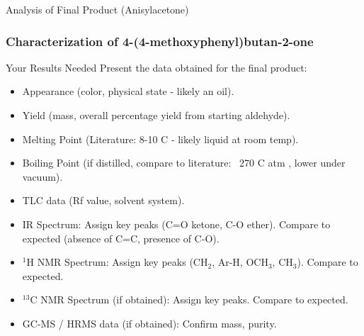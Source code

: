 \documentclass[10pt]{beamer}
\begin{document}
\begin{frame}{Analysis of Final Product (Anisylacetone)}
    \frametitle{Characterization of 4-(4-methoxyphenyl)butan-2-one}
     \begin{alertblock}{Your Results Needed}
        Present the data obtained for the final product:
        \begin{itemize}
            \item Appearance (color, physical state - likely an oil).
            \item Yield (mass, overall percentage yield from starting aldehyde).
            \item Melting Point (Literature: 8-10 \textdegree C \cite{AnisylacetoneChemBook} - likely liquid at room temp).
            \item Boiling Point (if distilled, compare to literature: ~270 \textdegree C atm \cite{AnisylacetoneChemImpex}, lower under vacuum).
            \item TLC data (Rf value, solvent system).
            \item IR Spectrum: Assign key peaks (C=O ketone, C-O ether). Compare to expected (absence of C=C, presence of C-O).
            \item $^1$H NMR Spectrum: Assign key peaks (CH$_2$, Ar-H, OCH$_3$, CH$_3$). Compare to expected.
            \item $^{13}$C NMR Spectrum (if obtained): Assign key peaks. Compare to expected.
            \item GC-MS / HRMS data (if obtained): Confirm mass, purity.
        \end{itemize}
     \end{alertblock}
\end{frame}
\end{document}
